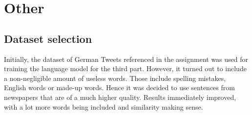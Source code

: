 \section{Other}

\subsection{Dataset selection}

Initially, the dataset of German Tweets referenced in the assignment was used for training the language model for the third part.
However, it turned out to include a non-negligible amount of useless words.
Those include spelling mistakes, English words or made-up words.
Hence it was decided to use sentences from newspapers that are of a much higher quality.
Results immediately improved, with a lot more words being included and similarity making sense.


